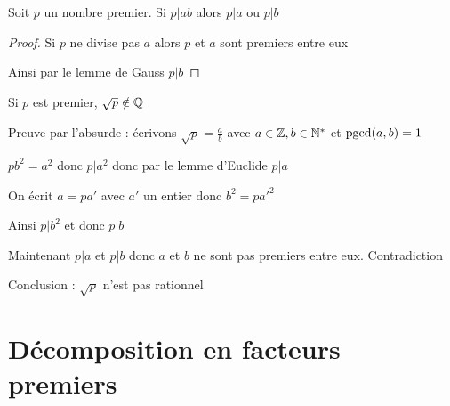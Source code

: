 \begin{frame}
  
\begin{proposition}
Soit $p$ un nombre premier.
Si $p | ab$ alors $p|a$ ou $p | b$
\end{proposition}

\pause

\begin{proof}
Si $p$ ne divise pas $a$ alors $p$ et $a$ sont premiers entre eux 

\pause

Ainsi par le lemme de Gauss $p | b$
\end{proof}

\pause
\medskip

\begin{exemple}
Si $p$ est premier, $\sqrt{p} \notin \mathbb{Q}$

\pause
\medskip

{\footnotesize
\quad Preuve par l'absurde : écrivons $\sqrt p =\frac ab$
\quad avec $a \in \mathbb{Z}, b \in \mathbb{N}^*$ et $\mathop{\text{pgcd}}\nolimits(a,b)=1$

\pause

\quad $p b^2 = a^2$ donc $p | a^2$ donc par le lemme d'Euclide $p | a$

\pause

\quad On écrit $a = p a'$ avec $a'$ un entier donc $b^2 = p a'^2$

\pause

\quad Ainsi $p | b^2$ et donc $p|b$

\pause

\quad Maintenant $p|a$ et $p|b$ donc $a$ et $b$ ne sont pas premiers entre eux. Contradiction

\pause

\quad Conclusion : $\sqrt p$ n'est pas rationnel
}
\end{exemple}
\end{frame}



\section{Décomposition en facteurs premiers}


